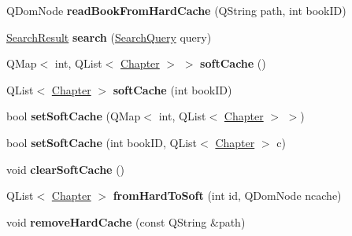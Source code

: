 \begin{CompactItemize}
\item 
\hypertarget{classZefaniaBible_d6aa8172ba4fc50114314c1f91a28204}{
QDomNode \textbf{readBookFromHardCache} (QString path, int bookID)}
\label{classZefaniaBible_d6aa8172ba4fc50114314c1f91a28204}

\item 
\hypertarget{classZefaniaBible_31e7ab30e35e4c59e7a0e74acbb30951}{
\hyperlink{classSearchResult}{SearchResult} \textbf{search} (\hyperlink{classSearchQuery}{SearchQuery} query)}
\label{classZefaniaBible_31e7ab30e35e4c59e7a0e74acbb30951}

\item 
\hypertarget{classZefaniaBible_bc7e89561a9b87d4cb5511f29c7e51a6}{
QMap$<$ int, QList$<$ \hyperlink{structChapter}{Chapter} $>$ $>$ \textbf{softCache} ()}
\label{classZefaniaBible_bc7e89561a9b87d4cb5511f29c7e51a6}

\item 
\hypertarget{classZefaniaBible_89c9044afabfd52fc35a9ec2ce7c53e7}{
QList$<$ \hyperlink{structChapter}{Chapter} $>$ \textbf{softCache} (int bookID)}
\label{classZefaniaBible_89c9044afabfd52fc35a9ec2ce7c53e7}

\item 
\hypertarget{classZefaniaBible_1fb566001269984db4a9f4ba356e350e}{
bool \textbf{setSoftCache} (QMap$<$ int, QList$<$ \hyperlink{structChapter}{Chapter} $>$ $>$)}
\label{classZefaniaBible_1fb566001269984db4a9f4ba356e350e}

\item 
\hypertarget{classZefaniaBible_eba49dcbd061042236e788c1ababa10c}{
bool \textbf{setSoftCache} (int bookID, QList$<$ \hyperlink{structChapter}{Chapter} $>$ c)}
\label{classZefaniaBible_eba49dcbd061042236e788c1ababa10c}

\item 
\hypertarget{classZefaniaBible_e93f27ca8ff9b7076cbe7df1575d2228}{
void \textbf{clearSoftCache} ()}
\label{classZefaniaBible_e93f27ca8ff9b7076cbe7df1575d2228}

\item 
\hypertarget{classZefaniaBible_9a1467f126feca52ccc024f4ffbcd8e9}{
QList$<$ \hyperlink{structChapter}{Chapter} $>$ \textbf{fromHardToSoft} (int id, QDomNode ncache)}
\label{classZefaniaBible_9a1467f126feca52ccc024f4ffbcd8e9}

\item 
\hypertarget{classZefaniaBible_6674b121cf33de65102e7fea48c1cf01}{
void \textbf{removeHardCache} (const QString \&path)}
\label{classZefaniaBible_6674b121cf33de65102e7fea48c1cf01}

\end{CompactItemize}

